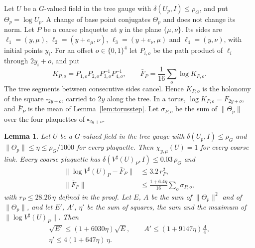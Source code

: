 \documentclass[11pt]{amsart}
\newtheorem{lemma}[theorem]{Lemma}
\theoremstyle{definition}
\theoremstyle{remark}
\numberwithin{equation}{section}
\begin{document}
Let $U$ be a $G$-valued field in the tree gauge with $\delta(U_p,I)\le
\rho_G$, and put $\Theta_p=\log U_p$. A change of base point conjugates
$\Theta_p$ and does not change its norm. Let $P$ be a coarse plaquette at $y$
in the plane $\{\mu,\nu\}$. Its sides are $\ell_1=(y,\mu)$, $\ell_2=(y+
e_\mu,\nu)$, $\ell_3=(y+e_\nu,\mu)$ and $\ell_4=(y,\nu)$, with initial
points $y_i$. For an offset $o\in\{0,1\}^4$ let $P_{i,o}$ be the path
product of $\ell_i$ through $2y_i+o$, and put
\[
K_{P,o}=P_{1,o}P_{2,o}P_{3,o}^{-1}P_{4,o}^{-1},\qquad\bar F_P=\frac1{16}
\sum_o\log K_{P,o}.
\]
The tree segments between consecutive sides cancel. Hence $K_{P,o}$ is the
holonomy of the square $\square_{2y+o}$, carried to $2y$ along the tree.
In a torus, $\log K_{P,o}=F_{2y+o}$, and $\bar F_P$ is the mean of
Lemma~\ref{lem:torusstep}. Let $\sigma_{P,o}$ be the sum of $\lVert
\Theta_p\rVert$ over the four plaquettes of $\square_{2y+o}$.

\begin{lemma}\label{lem:smallstep}
Let $U$ be a $G$-valued field in the tree gauge with $\delta(U_p,I)\le
\rho_G$ and $\lVert\Theta_p\rVert\le\eta\le\rho_G/1000$ for every
plaquette. Then $\chi_{y,\mu}(U)=1$ for every coarse link. Every coarse
plaquette has $\delta(V^\sharp(U)_P,I)\le0.03\,\rho_G$ and
\begin{equation}\label{eq:smallstep}
\begin{aligned}
\bigl\lVert\log V^\sharp(U)_P-\bar F_P\bigr\rVert&\le3.2\,r_P^2,\\
\lVert\bar F_P\rVert&\le\frac{1+6.4\eta}{16}\sum_o\sigma_{P,o},
\end{aligned}
\end{equation}
with $r_P\le28.26\,\eta$ defined in the proof. Let $E$, $A$ be the sum of
$\lVert\Theta_p\rVert^2$ and of $\lVert\Theta_p\rVert$, and let $E'$, $A'$,
$\eta'$ be the sum of squares, the sum and the maximum of $\lVert\log
V^\sharp(U)_P\rVert$. Then
\begin{gather*}
\sqrt{E'}\le(1+6030\eta)\sqrt E,\qquad A'\le(1+9147\eta)\frac A4,\\
\eta'\le4(1+647\eta)\,\eta .
\end{gather*}
\end{lemma}
\end{document}
